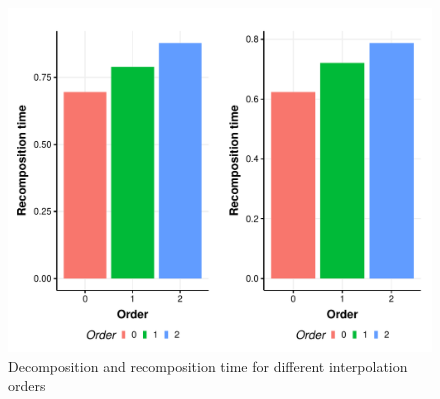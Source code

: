 \documentclass[conference]{IEEEtran}
\theoremstyle{remark}
\begin{document}
\begin{figure}[h]

    \centering
    \includegraphics[width=\linewidth]{Img/time_orders.pdf}
    \caption{Decomposition and recomposition time for different interpolation orders}
    \label{fig:time_uniform}
\end{figure}
\end{document}
